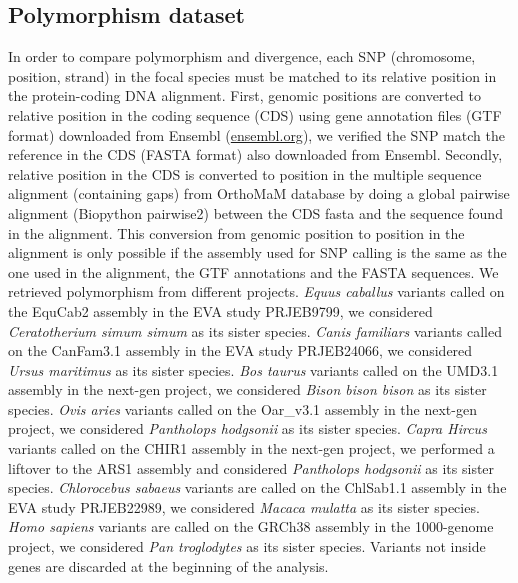 \documentclass{article}
\begin{document}
\subsection*{Polymorphism dataset}

In order to compare polymorphism and divergence, each SNP (chromosome, position, strand) in the focal species must be matched to its relative position in the protein-coding DNA alignment.
First, genomic positions are converted to relative position in the coding sequence (CDS) using gene annotation files (GTF format) downloaded from Ensembl (\url{ensembl.org}), we verified the SNP match the reference in the CDS (FASTA format) also downloaded from Ensembl.
Secondly, relative position in the CDS is converted to position in the multiple sequence alignment (containing gaps) from OrthoMaM database\cite{ranwez_orthomam_2007, douzery_orthomam_2014, scornavacca_orthomam_2019} by doing a global pairwise alignment (Biopython pairwise2) between the CDS fasta and the sequence found in the alignment.
This conversion from genomic position to position in the alignment is only possible if the assembly used for SNP calling is the same as the one used in the alignment, the GTF annotations and the FASTA sequences.
We retrieved polymorphism from different projects.
\textit{Equus caballus} variants called on the EquCab2 assembly in the EVA study PRJEB9799, we considered \textit{Ceratotherium simum simum} as its sister species.
\textit{Canis familiars} variants called on the CanFam3.1 assembly in the EVA study PRJEB24066, we considered \textit{Ursus maritimus} as its sister species.
\textit{Bos taurus} variants called on the UMD3.1 assembly in the next-gen project, we considered \textit{Bison bison bison} as its sister species.
\textit{Ovis aries} variants called on the Oar\_v3.1 assembly in the next-gen project, we considered \textit{Pantholops hodgsonii} as its sister species.
\textit{Capra Hircus} variants called on the CHIR1 assembly in the next-gen project, we performed a liftover to the ARS1 assembly and considered \textit{Pantholops hodgsonii} as its sister species.
\textit{Chlorocebus sabaeus} variants are called on the ChlSab1.1 assembly in the EVA study PRJEB22989\cite{svardal_ancient_2017}, we considered \textit{Macaca mulatta} as its sister species.
\textit{Homo sapiens} variants are called on the GRCh38 assembly in the 1000-genome project\cite{consortium_integrated_2012, the_1000_genomes_project_consortium_global_2015}, we considered \textit{Pan troglodytes} as its sister species.
Variants not inside genes are discarded at the beginning of the analysis.
\end{document}
